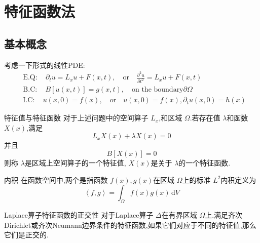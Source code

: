 \documentclass[../../main.tex]{subfiles}
\begin{document}
\chapter{ 特征函数法 }

\section{基本概念}

考虑一下形式的线性PDE: \[
\begin{aligned}
 &\mathrm{E}.\mathrm{Q}:\quad \partial _{t}u= L_{x}u+ F\left( x,t \right) ,\quad \text{or}\quad \frac{\partial ^{2}u}{\partial t^{2}}= L_{x}u+ F\left( x,t \right)   \\ 
  & \mathrm{B}.\mathrm{C}: \quad B[u\left( x,t \right) ]= g\left( x,t \right),\quad \text{on the boundary} \partial  \Omega \\ 
   & \mathrm{I}.\mathrm{C}:\quad  u\left( x,0 \right)= f\left( x \right)   , \quad \text{or} \quad  u\left( x,0 \right)= f\left( x \right),  \partial _{t}u\left( x,0 \right)= h\left( x \right)    
\end{aligned}
\]


\begin{definition}{特征值与特征函数}
    对于上述问题中的空间算子 \(  L_{x}  \),和区域 \(   \Omega   \).若存在值 \(   \lambda   \)和函数 \(  X\left( x \right)   \),满足 \[
    L_{x}X\left( x \right)+ \lambda X\left( x \right)=    0
    \]并且 \[
    B\left[ X\left( x \right)  \right]= 0 
    \]    则称 \(   \lambda   \)是区域上空间算子的一个特征值, \(  X\left( x \right)   \)是关于 \(   \lambda   \)的一个特征函数.   
\end{definition}

\begin{definition}{内积}
    在函数空间中,两个是指函数 \(  f\left( x \right),g\left( x \right)    \)在区域 \(   \Omega   \)上的标准 \(  L^{2}  \)内积定义为 \[
    \left<f,g \right>= \int_{ \Omega }f\left( x \right)g\left( x \right)\,\mathrm{d} V  
    \]   
\end{definition}
\begin{theorem}{Laplace算子特征函数的正交性}
    对于Laplace算子 \(   \Delta   \)在有界区域 \(   \Omega   \)上.满足齐次Dirichlet或齐次Neumann边界条件的特征函数,如果它们对应于不同的特征值,那么它们是正交的.  
\end{theorem}
\end{document}

